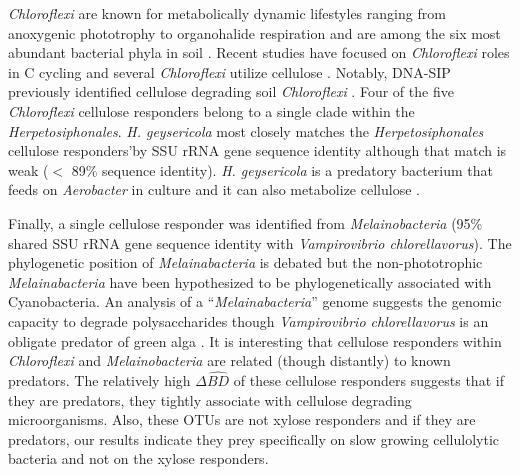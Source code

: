 \textit{Chloroflexi} are known for metabolically dynamic lifestyles ranging
from anoxygenic phototrophy to organohalide respiration \citep{Hug_2013} and
are among the six most abundant bacterial phyla in soil \citep{Janssen2006}.
Recent studies have focused on \textit{Chloroflexi} roles in C cycling
\citep{Hug_2013,Goldfarb_2011,Cole_2013} and several \textit{Chloroflexi}
utilize cellulose \citep{Hug_2013,Goldfarb_2011,Cole_2013}. Notably, DNA-SIP
previously identified cellulose degrading soil \textit{Chloroflexi}
\citep{Schellenberger_2010}. Four of the five \textit{Chloroflexi} cellulose
responders belong to a single clade within the \textit{Herpetosiphonales}.
\textit{H. geysericola} most closely matches the \textit{Herpetosiphonales}
cellulose responders'by SSU rRNA gene sequence identity although that match is
weak ($<$ 89\% sequence identity). \textit{H. geysericola} is
a predatory bacterium that feeds on \textit{Aerobacter} in culture and it can
also metabolize cellulose \citep{Lewin1970}. 

Finally, a single cellulose responder was identified from
\textit{Melainobacteria} (95\% shared SSU rRNA gene sequence identity with
\textit{Vampirovibrio chlorellavorus}). The phylogenetic position of
\textit{Melainabacteria} is debated but the non-phototrophic
\textit{Melainabacteria} have been hypothesized to be phylogenetically
associated with Cyanobacteria. An analysis of a ``\textit{Melainabacteria}''
genome \citep{Di_Rienzi_2013} suggests the genomic capacity to degrade
polysaccharides though \textit{Vampirovibrio chlorellavorus} is an obligate
predator of green alga \citep{gromov_1972}. It is interesting that cellulose
responders within \textit{Chloroflexi} and \textit{Melainobacteria} are related
(though distantly) to known predators. The relatively high $\Delta\hat{BD}$ of
these cellulose responders suggests that if they are predators, they tightly
associate with cellulose degrading microorganisms. Also, these OTUs are not
xylose responders and if they are predators, our results indicate they prey
specifically on slow growing cellulolytic bacteria and not on the xylose
responders. 

